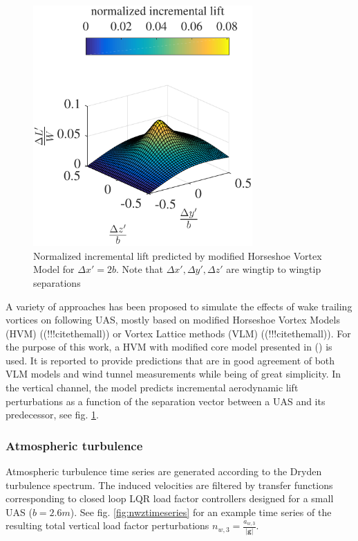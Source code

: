 \documentclass{ifacconf}
\providecommand{\mbf}[1]{\mathbf{#1}}
\begin{document}
\begin{figure}
\begin{center}
\includegraphics[width=8.4cm]{incrementallift}    %
\caption{Normalized incremental lift predicted by modified Horseshoe Vortex Model for $\Delta x' = 2b$. Note that $\Delta x', \Delta y', \Delta z'$ are wingtip to wingtip separations}
\label{fig:HSVMincrementalift}
\end{center}
\end{figure}

A variety of approaches has been proposed to simulate the effects of wake trailing vortices on following UAS, mostly based on modified Horseshoe Vortex Models (HVM) ((!!!citethemall)) or Vortex Lattice methods (VLM) ((!!!citethemall)). For the purpose of this work, a HVM with modified core model presented in (\cite{dogan2005modeling}) is used. It is reported to provide predictions that are in good agreement of both VLM models and wind tunnel measurements while being of great simplicity. In the vertical channel, the model predicts incremental aerodynamic lift perturbations as a function of the separation vector between a UAS and its predecessor, see fig. \ref{fig:HSVMincrementalift}.

\subsubsection{Atmospheric turbulence}
Atmospheric turbulence time series are generated according to the Dryden turbulence spectrum. The induced velocities are filtered by transfer functions corresponding to closed loop LQR load factor controllers designed for a small UAS ($b=2.6m$). See fig. \ref{fig:nwztimeseries} for an example time series of the resulting total vertical load factor perturbations $n_{w,3} = \frac{a_{w,3}}{|\mbf{g}|}$.
\end{document}
